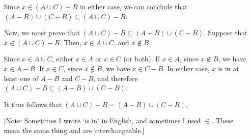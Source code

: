 \documentclass[12pt]{amsart}
\begin{document}
\begin{enumerate}[1.]
Since $x \in (A \cup C) - B$ in either case, we can conclude
that
$(A - B) \cup (C - B) \subseteq (A \cup C) - B$.

Now, we must prove that $(A \cup C) - B
\subseteq (A- B) \cup (C - B)$. Suppose that $x \in (A \cup C) - B$.
Then, $x \in A \cup C$, and $x \not \in B$. 

Since $x \in A \cup C$, either $x \in A$ or $x \in C$ (or both).
If $x \in A$, since $x \not \in B$, we have $x \in A - B$.
If $x \in C$, since $x \not \in B$, we have $x \in C - B$.
In either case, $x$ is in at least one of $A - B$ and $C - B$,
and therefore $(A \cup C) - B
\subseteq (A- B) \cup (C - B)$.

It thus follows that
$(A \cup C) - B = (A- B) \cup (C - B)$.

[Note: Sometimes I wrote `is in' in English, and sometimes I used $\in$. These mean
the same thing and are interchangeable.]
\end{enumerate}
\end{document}
